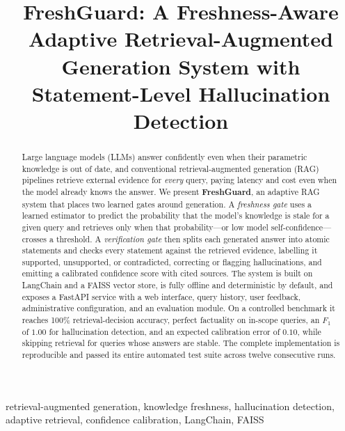 \documentclass[conference]{IEEEtran}
\begin{document}
\title{FreshGuard: A Freshness-Aware Adaptive Retrieval-Augmented\\
Generation System with Statement-Level Hallucination Detection}

\author{
}

\maketitle

\begin{abstract}
Large language models (LLMs) answer confidently even when their parametric
knowledge is out of date, and conventional retrieval-augmented generation (RAG)
pipelines retrieve external evidence for \emph{every} query, paying latency and
cost even when the model already knows the answer. We present \textbf{FreshGuard},
an adaptive RAG system that places two learned gates around generation. A
\emph{freshness gate} uses a learned estimator to predict the probability that the
model's knowledge is stale for a given query and retrieves only when that
probability---or low model self-confidence---crosses a threshold. A
\emph{verification gate} then splits each generated answer into atomic statements
and checks every statement against the retrieved evidence, labelling it supported,
unsupported, or contradicted, correcting or flagging hallucinations, and emitting a
calibrated confidence score with cited sources. The system is built on
LangChain and a FAISS vector store, is fully offline and deterministic by default,
and exposes a FastAPI service with a web interface, query history, user feedback,
administrative configuration, and an evaluation module. On a controlled benchmark it
reaches 100\% retrieval-decision accuracy, perfect factuality on in-scope queries, an
$F_1$ of $1.00$ for hallucination detection, and an expected calibration error of
$0.10$, while skipping retrieval for queries whose answers are stable. The complete
implementation is reproducible and passed its entire automated test suite across
twelve consecutive runs.
\end{abstract}

\begin{IEEEkeywords}
retrieval-augmented generation, knowledge freshness, hallucination detection,
adaptive retrieval, confidence calibration, LangChain, FAISS
\end{IEEEkeywords}
\end{document}
